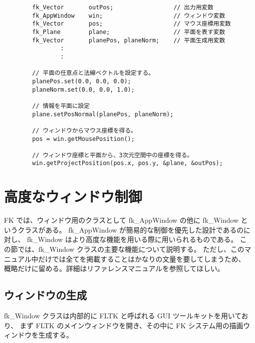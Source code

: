 \begin{breakbox}
\begin{verbatim}
        fk_Vector       outPos;                 // 出力用変数
        fk_AppWindow    win;                    // ウィンドウ変数
        fk_Vector       pos;                    // マウス座標用変数
        fk_Plane        plane;                  // 平面を表す変数
        fk_Vector       planePos, planeNorm;    // 平面生成用変数
                :
                :

        // 平面の任意点と法線ベクトルを設定する。
        planePos.set(0.0, 0.0, 0.0);
        planeNorm.set(0.0, 0.0, 1.0);

        // 情報を平面に設定
        plane.setPosNormal(planePos, planeNorm);

        // ウィンドウからマウス座標を得る。
        pos = win.getMousePosition();

        // ウィンドウ座標と平面から、3次元空間中の座標を得る。
        win.getProjectPosition(pos.x, pos.y, &plane, &outPos);
\end{verbatim}
\end{breakbox}

\section{高度なウィンドウ制御}
FK では、ウィンドウ用のクラスとして fk\_AppWindow の他に fk\_Window というクラスがある。
fk\_AppWindow が簡易的な制御を優先した設計であるのに対し、
fk\_Window はより高度な機能を用いる際に用いられるものである。
この節では、fk\_Window クラスの主要な機能について説明する。
ただし、このマニュアル中だけでは全てを掲載することはかなりの文量を要してしまうため、
概略だけに留める。詳細はリファレンスマニュアルを参照してほしい。

\subsection{ウィンドウの生成}
fk\_Window クラスは内部的に FLTK と呼ばれる GUI ツールキットを用いており、
まず FLTK のメインウィンドウを開き、その中に
FK システム用の描画ウィンドウを生成する。

